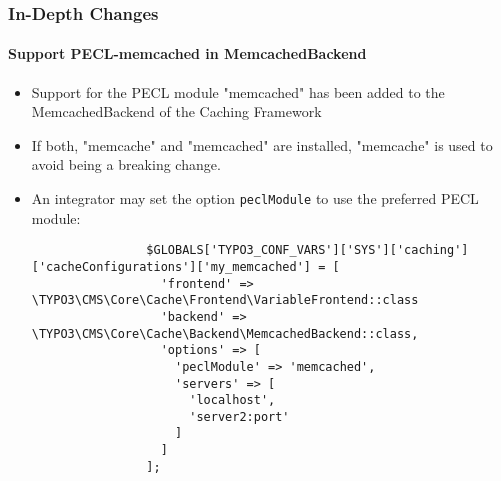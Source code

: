 \begin{frame}[fragile]
	\frametitle{In-Depth Changes}
	\framesubtitle{Support PECL-memcached in MemcachedBackend}

	\lstset{basicstyle=\tiny\ttfamily}

	\begin{itemize}

		\item Support for the PECL module "memcached" has been added to the
			MemcachedBackend of the Caching Framework

		\item If both, "memcache" and "memcached" are installed, "memcache"
			is used to avoid being a breaking change.

		\item An integrator may set the option \texttt{peclModule} to use the
			preferred PECL module:

			\begin{lstlisting}
				$GLOBALS['TYPO3_CONF_VARS']['SYS']['caching']['cacheConfigurations']['my_memcached'] = [
				  'frontend' => \TYPO3\CMS\Core\Cache\Frontend\VariableFrontend::class
				  'backend' => \TYPO3\CMS\Core\Cache\Backend\MemcachedBackend::class,
				  'options' => [
				    'peclModule' => 'memcached',
				    'servers' => [
				      'localhost',
				      'server2:port'
				    ]
				  ]
				];
			\end{lstlisting}

	\end{itemize}

\end{frame}


